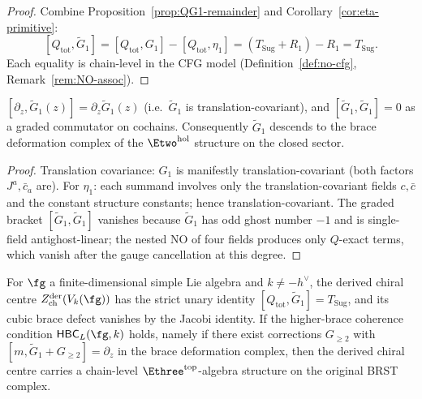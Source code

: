 \begin{proof}
Combine Proposition~\ref{prop:QG1-remainder} and
Corollary~\ref{cor:eta-primitive}:
\[
 [Q_{\mathrm{tot}}, \widetilde G_1]
 = [Q_{\mathrm{tot}}, G_1] - [Q_{\mathrm{tot}}, \eta_1]
 = (T_{\mathrm{Sug}} + R_1) - R_1
 = T_{\mathrm{Sug}}.
\]
Each equality is chain-level in the CFG model
(Definition~\ref{def:no-cfg}, Remark~\ref{rem:NO-assoc}).
\end{proof}

\begin{proposition}
\label{prop:translation-inv-tildeG}
\ClaimStatusProvedHere
$[\partial_z, \widetilde G_1(z)] = \partial_z \widetilde G_1(z)$
(i.e.\ $\widetilde G_1$ is translation-covariant), and
$[\widetilde G_1, \widetilde G_1] = 0$ as a graded commutator
on cochains. Consequently $\widetilde G_1$ descends to the brace
deformation complex of the $\Etwo^{\mathrm{hol}}$ structure on
the closed sector.
\end{proposition}

\begin{proof}
Translation covariance: $G_1$ is manifestly translation-covariant
(both factors $J^a, \bar c_a$ are). For $\eta_1$: each summand
involves only the translation-covariant fields $c, \bar c$ and
the constant structure constants; hence translation-covariant.
The graded bracket $[\widetilde G_1, \widetilde G_1]$ vanishes
because $\widetilde G_1$ has odd ghost number $-1$ and is
single-field antighost-linear; the nested NO of four fields
produces only $Q$-exact terms, which vanish after the gauge
cancellation at this degree.
\end{proof}

\begin{theorem}
\label{thm:chain-level-E3-top-class-L}
\ClaimStatusConditional
For $\fg$ a finite-dimensional simple Lie algebra and
$k \ne -h^\vee$, the derived chiral centre
$Z^{\mathrm{der}}_{\mathrm{ch}}(V_k(\fg))$ has the strict
unary identity
$[Q_{\mathrm{tot}},\widetilde G_1]=T_{\mathrm{Sug}}$, and its
cubic brace defect vanishes by the Jacobi identity. If the
higher-brace coherence condition $\mathsf{HBC}_L(\fg,k)$ holds,
namely if there exist corrections $G_{\geq2}$ with
$[m,\widetilde G_1+G_{\geq2}]=\partial_z$ in the brace
deformation complex, then the derived chiral centre carries a
chain-level $\Ethree^{\mathrm{top}}$-algebra structure on the
original BRST complex.
\end{theorem}

